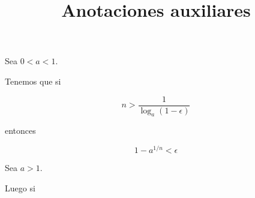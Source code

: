 \documentclass[12pt,a4paper]{article}
\title{Anotaciones auxiliares}
\begin{document}
Sea \( 0 < a < 1 \).

Tenemos que si

\[ n > \frac{1 }{\log_a(1-\epsilon)} \]


entonces


\[ 1- a^{1/n} < \epsilon \]

Sea \( a > 1 \).

Luego si 
\end{document}
